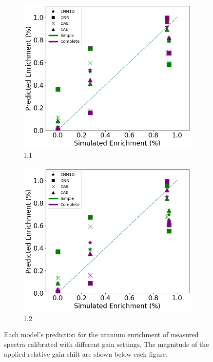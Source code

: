 \begin{figure}[H]
	\begin{subfigure}[b]{0.49\textwidth}
		\centering
		\includegraphics[width=\textwidth]{images/measured_uranium_11.png}
		\caption{1.1}
		\label{fig:measured_uranium_11}
	\end{subfigure}
	\hfill
	\begin{subfigure}[b]{0.49\textwidth}
		\centering
		\includegraphics[width=\textwidth]{images/measured_uranium_12.png}
		\caption{1.2}
		\label{fig:measured_uranium_12}
	\end{subfigure}
	\caption{Each model's prediction for the uranium enrichment of measured spectra calibrated with  different gain settings. The magnitude of the applied relative gain shift are shown below each figure.}
	\label{fig:realuranium-cal}
\end{figure}

